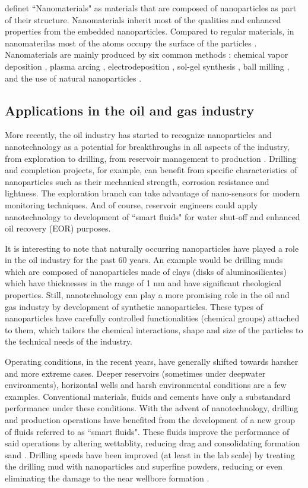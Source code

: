 \cite{Fakoya2017} definet ``Nanomaterials" as materials that are composed of nanoparticles as part of their structure. Nanomaterials inherit most of the qualities and enhanced properties from the embedded nanoparticles. Compared to regular materials, in nanomaterilas most of the atoms occupy the surface of the particles \citep{Wilson2002}. Nanomaterials are mainly produced by six common methods \citep{Hussainova2010}: chemical vapor deposition \citep{AZO2013}, plasma arcing \citep{Shashurin2015}, electrodeposition \citep{Bera2004}, sol-gel synthesis \citep{Ficai2017}, ball milling \citep{Cao2007}, and the use of natural nanoparticles \citep{Wilson2002}. 

\subsection{Applications in the oil and gas industry}
More recently, the oil industry has started to recognize nanoparticles and nanotechnology as a potential for breakthroughs in all aspects of the industry, from exploration to drilling, from reservoir management to production \citep{Cocuzza2011}. Drilling and completion projects, for example, can benefit from specific characteristics of nanoparticles such as their mechanical strength, corrosion resistance and lightness. The exploration branch can take advantage of nano-sensors for modern monitoring techniques. And of course, reservoir engineers could apply nanotechnology to development of ``smart fluids" for water shut-off and enhanced oil recovery (EOR) purposes. 

It is interesting to note that naturally occurring nanoparticles have played a role in the oil industry for the past 60 years. An example would be drilling muds which are composed of nanoparticles made of clays (disks of aluminosilicates) which have thicknesses in the range of 1 nm \citep{Krishnamoorti2015} and have significant rheological properties. Still, nanotechnology can play a more promising role in the oil and gas industry by development of synthetic nanoparticles. These types of nanoparticles have carefully controlled functionalities (chemical groups) attached to them, which tailors the chemical interactions, shape and size of the particles to the technical needs of the industry.

Operating conditions, in the recent years, have generally shifted towards harsher and more extreme cases. Deeper reservoirs (sometimes under deepwater environments), horizontal wells and harsh environmental conditions are a few examples. Conventional materials, fluids and cements have only a substandard performance under these conditions. With the advent of nanotechnology, drilling and production operations have benefited from the development of a new group of fluids referred to as ``smart fluids". These fluids improve the performance of said operations by altering wettablity, reducing drag and consolidating formation sand \citep{Wasan2003, Chaudhury2003, Amanullah2009}. Drilling speeds have been improved (at least in the lab scale) by treating the drilling mud with nanoparticles and superfine powders, reducing or even eliminating the damage to the near wellbore formation \citep{Esmaeili2011}.

